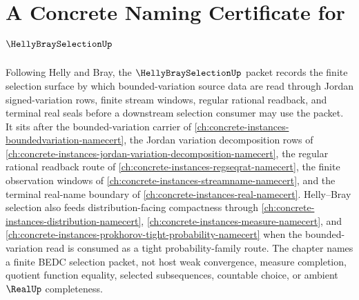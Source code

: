 \chapter{A Concrete Naming Certificate for $\HellyBraySelectionUp$}
\label{ch:concrete-instances-helly-bray-selection-namecert}

Following Helly and Bray, the $\HellyBraySelectionUp$ packet records the finite selection surface by which bounded-variation source data are read through Jordan signed-variation rows, finite stream windows, regular rational readback, and terminal real seals before a downstream selection consumer may use the packet. It sits after the bounded-variation carrier of \autoref{ch:concrete-instances-boundedvariation-namecert}, the Jordan variation decomposition rows of \autoref{ch:concrete-instances-jordan-variation-decomposition-namecert}, the regular rational readback route of \autoref{ch:concrete-instances-regseqrat-namecert}, the finite observation windows of \autoref{ch:concrete-instances-streamname-namecert}, and the terminal real-name boundary of \autoref{ch:concrete-instances-real-namecert}. Helly--Bray selection also feeds distribution-facing compactness through \autoref{ch:concrete-instances-distribution-namecert}, \autoref{ch:concrete-instances-measure-namecert}, and \autoref{ch:concrete-instances-prokhorov-tight-probability-namecert} when the bounded-variation read is consumed as a tight probability-family route. The chapter names a finite BEDC selection packet, not host weak convergence, measure completion, quotient function equality, selected subsequences, countable choice, or ambient $\RealUp$ completeness.

